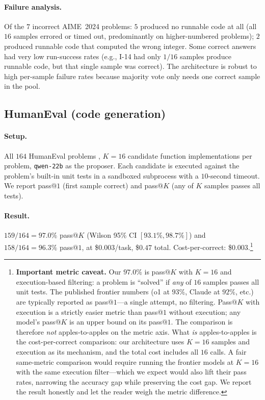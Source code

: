 \documentclass[11pt]{amsart}
\newcommand\1{{\mathds{1}}}
\theoremstyle{definition}
\theoremstyle{remark}
\numberwithin{equation}{section}
\begin{document}
\paragraph{Failure analysis.}
Of the $7$ incorrect AIME~2024 problems: $5$ produced no runnable code at all (all $16$ samples errored or timed out, predominantly on higher-numbered problems); $2$ produced runnable code that computed the wrong integer.
Some correct answers had very low run-success rates (e.g., I-14 had only $1/16$ samples produce runnable code, but that single sample was correct).
The architecture is robust to high per-sample failure rates because majority vote only needs one correct sample in the pool.

\subsection{HumanEval (code generation)}\label{sec:act2-humaneval}

\paragraph{Setup.}
All $164$ HumanEval problems \cite{Chen2021HumanEval}, $K\!=\!16$ candidate function implementations per problem, \texttt{qwen-22b} as the proposer.
Each candidate is executed against the problem's built-in unit tests in a sandboxed subprocess with a $10$-second timeout.
We report pass@$1$ (first sample correct) and pass@$K$ (any of $K$ samples passes all tests).

\paragraph{Result.}
$159/164 = 97.0\%$ pass@$K$ (Wilson 95\% CI $[93.1\%, 98.7\%]$) and $158/164 = 96.3\%$ pass@$1$, at \$$0.003$/task, \$$0.47$ total.
Cost-per-correct: \$$0.003$.\footnote{%
\textbf{Important metric caveat.}
Our $97.0\%$ is pass@$K$ with $K\!=\!16$ and execution-based filtering: a problem is ``solved'' if \emph{any} of $16$ samples passes all unit tests.
The published frontier numbers (o1 at $93\%$, Claude at $92\%$, etc.) are typically reported as pass@$1$---a single attempt, no filtering.
Pass@$K$ with execution is a strictly easier metric than pass@$1$ without execution; any model's pass@$K$ is an upper bound on its pass@$1$.
The comparison is therefore \emph{not} apples-to-apples on the metric axis.
What \emph{is} apples-to-apples is the cost-per-correct comparison: our architecture uses $K\!=\!16$ samples and execution as its mechanism, and the total cost includes all $16$ calls.
A fair same-metric comparison would require running the frontier models at $K\!=\!16$ with the same execution filter---which we expect would also lift their pass rates, narrowing the accuracy gap while preserving the cost gap.
We report the result honestly and let the reader weigh the metric difference.}
\end{document}
